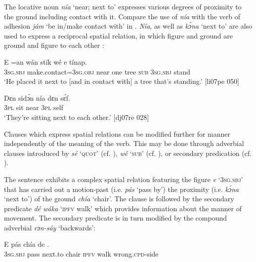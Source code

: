 The locative noun \textit{nía} ‘near; next to’ expresses various degrees of proximity to the ground including contact with it. Compare the use of \textit{nía} with the verb of adhesion \textit{jám} ‘be in/make contact with’ in . \textit{Nía}, as well as \textit{kɔ́na} ‘next to’ are also used to express a reciprocal spatial relation, in which figure and ground are ground and figure to each other : 


\ea%
    \label{ex:key:992}
    \gll E    =an            wán    stík  wé  e    tínap.\\
\textsc{3sg.sbj}  make.contact=\textsc{3sg.obj}  near    one    tree  \textsc{sub}  \textsc{3sg.sbj}  stand\\

\glt ‘He placed it next to [and in contact with] a tree that’s standing.’ [li07pe 050]
\z


\ea%
    \label{ex:key:993}
    \gll Dɛn  sidɔ́n  nía    dɛn  sɛ́f.\\
\textsc{3pl}  sit    near    \textsc{3pl}  self\\

\glt ‘They’re sitting next to each other.’ [dj07re 028]
\z

Clauses which express spatial relations can be modified further for manner independently of the meaning of the verb. This may be done through adverbial clauses introduced by \textit{sé} ‘\textsc{quot}’ (cf. ), \textit{wé} ‘\textsc{sub}’ (cf. ), or secondary predication (cf. ).


The sentence  exhibits a complex spatial relation featuring the figure \textit{e} ‘\textsc{3sg.sbj}’ that has carried out a motion-past (i.e. \textit{pás} ‘pass by’) the proximity (i.e. \textit{kɔ́na} ‘next to’) of the ground \textit{chía} ‘chair’. The clause is followed by the secondary predicate \textit{dé wáka} ‘\textsc{ipfv} walk’ which provides information about the\is{} manner of movement. The secondary predicate is in turn modified by the compound adverbial \textit{rɔn-sáy} ‘backwards’:



\ea%
    \label{ex:key:994}
    \gll E    pás  chía de   .\\
\textsc{3sg.sbj}  pass    next.to  chair  \textsc{ipfv}  walk  wrong.\textsc{cpd}{}-side\\

